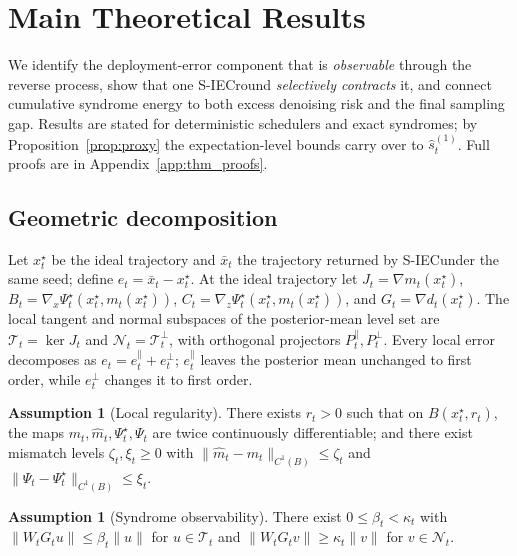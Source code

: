 \documentclass{article}
\theoremstyle{plain}
\theoremstyle{definition}
\newtheorem{assumption}[theorem]{Assumption}
\theoremstyle{remark}
\newcommand{\SIEC}{\texorpdfstring{S\mbox{-}IEC\xspace}{S-IEC }}
\begin{document}
\section{Main Theoretical Results}
\label{sec:theory}

We identify the deployment-error component that is \emph{observable} through
the reverse process, show that one \SIEC round \emph{selectively contracts}
it, and connect cumulative syndrome energy to both excess denoising risk and
the final sampling gap. Results are stated for deterministic schedulers and
exact syndromes; by Proposition~\ref{prop:proxy} the expectation-level
bounds carry over to \(\hat s_t^{(1)}\). Full proofs are in
Appendix~\ref{app:thm_proofs}.

\subsection{Geometric decomposition}

Let \(x_t^\star\) be the ideal trajectory and \(\bar x_t\) the trajectory
returned by \SIEC under the same seed; define \(e_t = \bar x_t - x_t^\star\).
At the ideal trajectory let \(J_t = \nabla m_t(x_t^\star)\),
\(B_t = \nabla_x\Psi_t^\star(x_t^\star,m_t(x_t^\star))\),
\(C_t = \nabla_z\Psi_t^\star(x_t^\star,m_t(x_t^\star))\), and
\(G_t = \nabla d_t(x_t^\star)\). The local tangent and normal subspaces of
the posterior-mean level set are \(\mathcal{T}_t = \ker J_t\) and
\(\mathcal{N}_t = \mathcal{T}_t^\perp\), with orthogonal projectors
\(P_t^\parallel, P_t^\perp\). Every local error decomposes as
\(e_t = e_t^\parallel + e_t^\perp\); \(e_t^\parallel\) leaves the posterior
mean unchanged to first order, while \(e_t^\perp\) changes it to first order.

\begin{assumption}[Local regularity]\label{asm:reg}
There exists \(r_t>0\) such that on \(B(x_t^\star,r_t)\), the maps
\(m_t, \hat m_t, \Psi_t^\star, \Psi_t\) are twice continuously differentiable;
and there exist mismatch levels \(\zeta_t,\xi_t\ge 0\) with
\(\|\hat m_t - m_t\|_{C^1(B)} \le \zeta_t\) and
\(\|\Psi_t - \Psi_t^\star\|_{C^1(B)} \le \xi_t\).
\end{assumption}

\begin{assumption}[Syndrome observability]\label{asm:obs}
There exist \(0 \le \beta_t < \kappa_t\) with
\(\|W_t G_t u\| \le \beta_t\|u\|\) for \(u\in\mathcal{T}_t\) and
\(\|W_t G_t v\| \ge \kappa_t\|v\|\) for \(v\in\mathcal{N}_t\).
\end{assumption}
\end{document}
